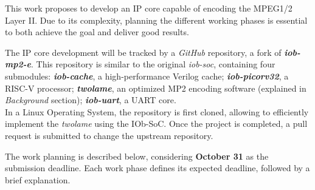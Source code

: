 
This work proposes to develop an IP core capable of encoding the MPEG1/2 Layer II. Due to its complexity, planning the different working phases is essential to both achieve the goal and deliver good results. 

The IP core development will be tracked by a \textit{GitHub} repository, a fork of \textbf{\textit{iob-mp2-e}}. This repository is similar to the original \textit{iob-soc}, containing four submodules: \textbf{\textit{iob-cache}}, a high-performance Verilog cache; \textbf{\textit{iob-picorv32}}, a RISC-V processor; \textbf{\textit{twolame}}, an optimized MP2 encoding software (explained in \textit{Background} section); \textbf{\textit{iob-uart}}, a UART core.\\
In a Linux Operating System, the repository is first cloned, allowing to efficiently implement the \textit{twolame} using the IOb-SoC. Once the project is completed, a pull request is submitted to change the upstream repository.

The work planning is described below, considering \textbf{October 31} as the submission deadline.
Each work phase defines its expected deadline, followed by a brief explanation.



